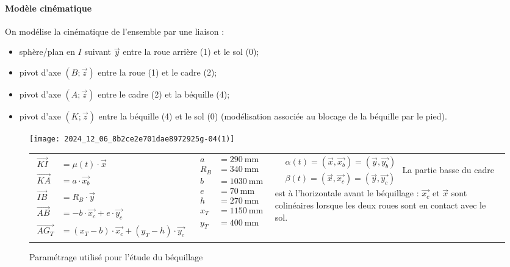 \paragraph*{Modèle cinématique} On modélise la cinématique de l'ensemble par une liaison :

\begin{itemize}
  \item sphère/plan en \(I\) suivant \(\vec{y}\) entre la roue arrière (1) et le sol (0);
  \item pivot d'axe \(( B ; \vec{z})\)  entre la roue (1) et le cadre (2);
  \item pivot d'axe \((A ; \vec{z})\) entre le cadre (2) et la béquille (4);
  \item pivot d'axe \((K ; \vec{z})\) entre la béquille (4) et le sol (0) (modélisation associée au blocage de la béquille par le pied).
\end{itemize}

\begin{figure}[!htb]
\centering

\texttt{[image: 2024\_12\_06\_8b2ce2e701dae8972925g-04(1)]}

\begin{tabular}{p{5cm}p{5cm}p{5cm}}
$
\begin{aligned}
\overrightarrow{K I} & =\mu(t) \cdot \vec{x} \\
\overrightarrow{K A} & =a \cdot \overrightarrow{x_{b}} \\
\overrightarrow{I B} & =R_{B} \cdot \vec{y} \\
\overrightarrow{A B} & =-b \cdot \overrightarrow{x_{c}}+e \cdot \overrightarrow{y_{c}} \\
\overrightarrow{A G_{T}} & =\left(x_{T}-b\right) \cdot \overrightarrow{x_{c}}+\left(y_{T}-h\right) \cdot \overrightarrow{y_{c}}
\end{aligned}
$
&
$
\begin{aligned}
a & =290 \mathrm{~mm} \\
R_{B} & =340 \mathrm{~mm} \\
b & =1030 \mathrm{~mm} \\
e & =70 \mathrm{~mm} \\
h & =270 \mathrm{~mm} \\
x_{T} & =1150 \mathrm{~mm} \\
y_{T} & =400 \mathrm{~mm}
\end{aligned}
$
&
$
\begin{aligned}
& \alpha(t)=\left(\vec{x}, \overrightarrow{x_{b}}\right)=\left(\vec{y}, \overrightarrow{y_{b}}\right) \\
& \beta(t)=\left(\vec{x}, \overrightarrow{x_{c}}\right)=\left(\vec{y}, \overrightarrow{y_{c}}\right)
\end{aligned}
$
La partie basse du cadre est à l'horizontale avant le béquillage : \(\overrightarrow{x_{c}}\) et \(\vec{x}\) sont colinéaires lorsque les deux roues sont en contact avec le sol.
\\
\end{tabular}
\caption{\label{fig_23} Paramétrage utilisé pour l'étude du béquillage}

\end{figure}



